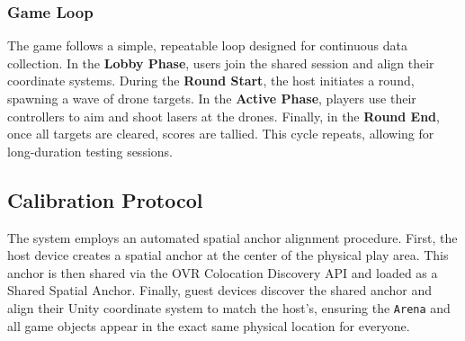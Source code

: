 
\subsubsection{Game Loop}
The game follows a simple, repeatable loop designed for continuous data collection. In the \textbf{Lobby Phase}, users join the shared session and align their coordinate systems. During the \textbf{Round Start}, the host initiates a round, spawning a wave of drone targets. In the \textbf{Active Phase}, players use their controllers to aim and shoot lasers at the drones. Finally, in the \textbf{Round End}, once all targets are cleared, scores are tallied. This cycle repeats, allowing for long-duration testing sessions.

\subsection{Calibration Protocol}

The system employs an automated spatial anchor alignment procedure. First, the host device creates a spatial anchor at the center of the physical play area. This anchor is then shared via the OVR Colocation Discovery API\cite{MetaColocationDiscovery2025} and loaded as a Shared Spatial Anchor\cite{MetaSharedSpatialAnchors2025}. Finally, guest devices discover the shared anchor and align their Unity coordinate system to match the host's, ensuring the \texttt{Arena} and all game objects appear in the exact same physical location for everyone.

